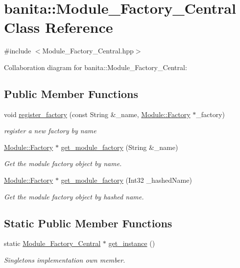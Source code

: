 \hypertarget{classbanita_1_1_module___factory___central}{}\section{banita\+::Module\+\_\+\+Factory\+\_\+\+Central Class Reference}
\label{classbanita_1_1_module___factory___central}


{\ttfamily \#include $<$Module\+\_\+\+Factory\+\_\+\+Central.\+hpp$>$}



Collaboration diagram for banita\+::Module\+\_\+\+Factory\+\_\+\+Central\+:
\subsection*{Public Member Functions}
\begin{DoxyCompactItemize}
\item 
void \mbox{\hyperlink{classbanita_1_1_module___factory___central_aef12a82bd2c051f7be1fc0ef22747517}{register\+\_\+factory}} (const String \&\+\_\+name, \mbox{\hyperlink{classbanita_1_1_module_1_1_factory}{Module\+::\+Factory}} $\ast$\+\_\+factory)
\begin{DoxyCompactList}\small\item\em register a new factory by name \end{DoxyCompactList}\item 
\mbox{\hyperlink{classbanita_1_1_module_1_1_factory}{Module\+::\+Factory}} $\ast$ \mbox{\hyperlink{classbanita_1_1_module___factory___central_a1ac99380daaa5ab3a5dffb29181e6858}{get\+\_\+module\+\_\+factory}} (String \&\+\_\+name)
\begin{DoxyCompactList}\small\item\em Get the module factory object by name. \end{DoxyCompactList}\item 
\mbox{\hyperlink{classbanita_1_1_module_1_1_factory}{Module\+::\+Factory}} $\ast$ \mbox{\hyperlink{classbanita_1_1_module___factory___central_a3b594f3e8a6ea6b2f4bf7c05c239c7c7}{get\+\_\+module\+\_\+factory}} (Int32 \+\_\+hashed\+Name)
\begin{DoxyCompactList}\small\item\em Get the module factory object by hashed name. \end{DoxyCompactList}\end{DoxyCompactItemize}
\subsection*{Static Public Member Functions}
\begin{DoxyCompactItemize}
\item 
static \mbox{\hyperlink{classbanita_1_1_module___factory___central}{Module\+\_\+\+Factory\+\_\+\+Central}} $\ast$ \mbox{\hyperlink{classbanita_1_1_module___factory___central_aba0eb5d045a61c1e85684c3e00ce62f5}{get\+\_\+instance}} ()
\begin{DoxyCompactList}\small\item\em Singleton\textquotesingle{}s implementation own member. \end{DoxyCompactList}\end{DoxyCompactItemize}
